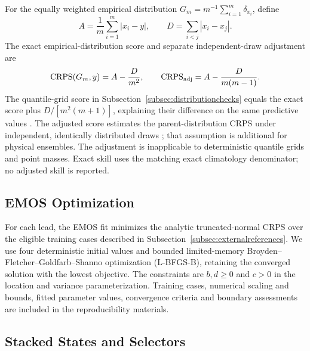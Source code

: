 For the equally weighted empirical distribution $G_m=m^{-1}\sum_{i=1}^m\delta_{x_i}$, define
\[
A=\frac1m\sum_{i=1}^m|x_i-y|,\qquad
D=\sum_{i<j}|x_i-x_j|.
\]
The exact empirical-distribution score and separate independent-draw adjustment are
\[
\mathrm{CRPS}(G_m,y)=A-\frac{D}{m^2},\qquad
\mathrm{CRPS}_{\rm adj}=A-\frac{D}{m(m-1)}.
\]
The quantile-grid score in Subsection~\ref{subsec:distributionchecks} equals the exact score plus $D/[m^2(m+1)]$, explaining their difference on the same predictive values \citep{zamo2018crps}. The adjusted score estimates the parent-distribution CRPS under independent, identically distributed draws \citep{ferro2014fair}; that assumption is additional for physical ensembles. The adjustment is inapplicable to deterministic quantile grids and point masses. Exact skill uses the matching exact climatology denominator; no adjusted skill is reported.

\subsection{EMOS Optimization}
\label{app:emoscomputation}

For each lead, the EMOS fit minimizes the analytic truncated-normal CRPS over the eligible training cases described in Subsection~\ref{subsec:externalreferences}. We use four deterministic initial values and bounded limited-memory Broyden--Fletcher--Goldfarb--Shanno optimization (L-BFGS-B), retaining the converged solution with the lowest objective. The constraints are \(b,d\geq0\) and \(c>0\) in the location and variance parameterization. Training cases, numerical scaling and bounds, fitted parameter values, convergence criteria and boundary assessments are included in the reproducibility materials.

\subsection{Stacked States and Selectors}
\label{app:stackedstates}

